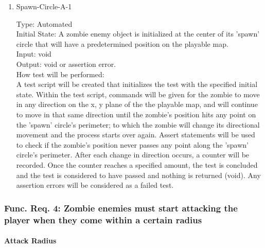 \documentclass[12pt, titlepage]{article}
\begin{document}
\begin{enumerate}

\item{Spawn-Circle-A-1\\}

Type: Automated\\
					
Initial State: A zombie enemy object is initialized at the center of its 'spawn' circle that will have a predetermined position on the playable map.\\
					
Input: void \\
					
Output: void or assertion error.\\
					
How test will be performed:\\ A test script will be created that initializes the test with the specified initial state. Within the test script, commands will be given for the zombie to move in any direction on the x, y plane of the the playable map, and will continue to move in that same direction until the zombie's position hits any point on the 'spawn' circle's perimeter; to which the zombie will change its directional movement and the process starts over again. Assert statements will be used to check if the zombie's position never passes any point along the 'spawn' circle's perimeter. After each change in direction occurs, a counter will be recorded. Once the counter reaches a specified amount, the test is concluded and the test is considered to have passed and nothing is returned (void). Any assertion errors will be considered as a failed test. \\

\end{enumerate}

\subsubsection{Func. Req. 4: Zombie enemies must start attacking the player when they come within a certain radius}
		
\paragraph{Attack Radius}
\end{document}
